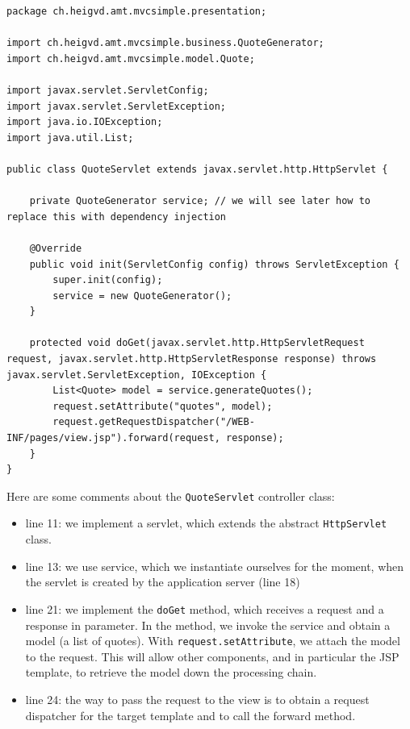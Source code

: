 \vspace{10pt}
\begin{minipage}{\linewidth}
\begin{lstlisting}[frame=single]
package ch.heigvd.amt.mvcsimple.presentation;

import ch.heigvd.amt.mvcsimple.business.QuoteGenerator;
import ch.heigvd.amt.mvcsimple.model.Quote;

import javax.servlet.ServletConfig;
import javax.servlet.ServletException;
import java.io.IOException;
import java.util.List;

public class QuoteServlet extends javax.servlet.http.HttpServlet {

    private QuoteGenerator service; // we will see later how to replace this with dependency injection

    @Override
    public void init(ServletConfig config) throws ServletException {
        super.init(config);
        service = new QuoteGenerator();
    }

    protected void doGet(javax.servlet.http.HttpServletRequest request, javax.servlet.http.HttpServletResponse response) throws javax.servlet.ServletException, IOException {
        List<Quote> model = service.generateQuotes();
        request.setAttribute("quotes", model);
        request.getRequestDispatcher("/WEB-INF/pages/view.jsp").forward(request, response);
    }
}
\end{lstlisting}
\end{minipage}

Here are some comments about the \texttt{QuoteServlet} controller class:

\begin{itemize}
\item line 11: we implement a servlet, which extends the abstract \texttt{HttpServlet} class.
\item line 13: we use service, which we instantiate ourselves for the moment, when the servlet is created by the application server (line 18)
\item line 21: we implement the \texttt{doGet} method, which receives a request and a response in parameter. In the method, we invoke the service and obtain a model (a list of quotes). With \texttt{request.setAttribute}, we attach the model to the request. This will allow other components, and in particular the \ac{JSP} template, to retrieve the model down the processing chain.
\item line 24: the way to pass the request to the view is to obtain a request dispatcher for the target template and to call the forward method.
\end{itemize}

